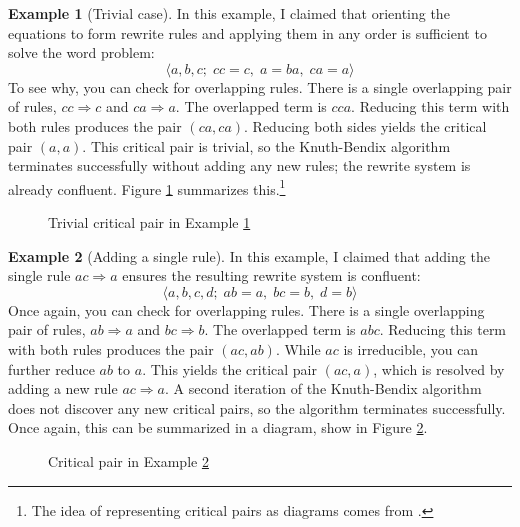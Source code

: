 \documentclass[headsepline,bibliography=totoc]{scrreport}
\theoremstyle{definition}
\newtheorem{example}{Example}[chapter]
\theoremstyle{definition}
\theoremstyle{definition}
\begin{document}
\begin{example}[Trivial case]\label{trivialex}
In this example, I claimed that orienting the equations to form rewrite rules and applying them in any order is sufficient to solve the word problem:
\[\langle a,b,c;\; cc=c,\; a=ba,\; ca=a\rangle\]
To see why, you can check for overlapping rules. There is a single overlapping pair of rules, $cc\Rightarrow c$ and $ca\Rightarrow a$. The overlapped term is $cca$. Reducing this term with both rules produces the pair $(ca,ca)$. Reducing both sides yields the critical pair $(a, a)$. This critical pair is trivial, so the Knuth-Bendix algorithm terminates successfully without adding any new rules; the rewrite system is already confluent. Figure \ref{trivialfig} summarizes this.\footnote{The idea of representing critical pairs as diagrams comes from \cite{guiraud:hal-00818253}.}
\begin{figure}\caption{Trivial critical pair in Example \ref{trivialex}}\label{trivialfig}
\begin{center}
\end{center}
\end{figure}
\end{example}

\begin{example}[Adding a single rule]\label{singleruleex}
In this example, I claimed that adding the single rule $ac\Rightarrow a$ ensures the resulting rewrite system is confluent:
\[\langle a, b, c, d;\; ab=a,\; bc=b,\; d=b\rangle\]
Once again, you can check for overlapping rules. There is a single overlapping pair of rules, $ab\Rightarrow a$ and $bc\Rightarrow b$. The overlapped term is $abc$. Reducing this term with both rules produces the pair $(ac,ab)$. While $ac$ is irreducible, you can further reduce $ab$ to $a$. This yields the critical pair $(ac,a)$, which is resolved by adding a new rule $ac\Rightarrow a$. A second iteration of the Knuth-Bendix algorithm does not discover any new critical pairs, so the algorithm terminates successfully. Once again, this can be summarized in a diagram, show in Figure \ref{singleruleex}.
\begin{figure}\caption{Critical pair in Example \ref{singleruleex}}\label{singlerulefig}
\begin{center}
\end{center}
\end{figure}
\end{example}
\end{document}
